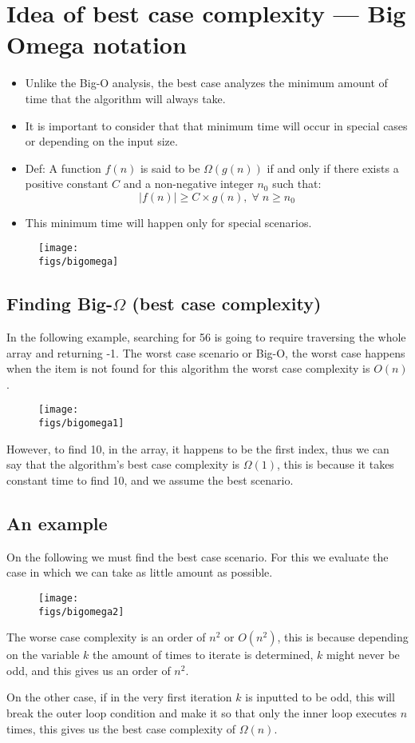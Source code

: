 \section{Idea of best case complexity — Big Omega notation}
\begin{itemize}
    \item Unlike the Big-O analysis, the best case analyzes the minimum amount of time that the algorithm will always take. 
    \item It is important to consider that that minimum time will occur in special cases or depending on the input size. 
    \item Def: A function $f(n)$ is said to be $\Omega(g(n))$ if and only if there exists a positive constant $C$ and a non-negative integer $n_0$ such that: 
        \[
          \left| f(n) \right| \geq C \times g(n), \; \forall \; n \geq n_0  
        \]
    
    \item This minimum time will happen only for special scenarios. 
\end{itemize}
\begin{figure}[H]
    \centering
    \texttt{[image: \\figs/bigomega]} 
\end{figure}

\subsection{Finding Big-$\Omega$ (best case complexity)}
In the following example, searching for 56 is going to require traversing the whole array and returning -1.  The worst case scenario or Big-O, the worst case happens when the item is not found for this algorithm the worst case complexity is $O(n)$.
\begin{figure}[H]
    \centering
    \texttt{[image: \\figs/bigomega1]} 
\end{figure}
However, to find 10, in the array, it happens to be the first index, thus we can say that the algorithm's best case complexity is $\Omega(1)$, this is because it takes constant time to find 10, and we assume the best scenario. 

\subsection{An example}
On the following we must find the best case scenario. For this we evaluate the case in which we can take as little amount as possible.
\begin{figure}[H]
    \centering
    \texttt{[image: \\figs/bigomega2]} 
\end{figure}
The worse case complexity is an order of $n^2$ or $O(n^2)$, this is because depending on the variable $k$ the amount of times to iterate is determined, $k$ might never be odd, and this gives us an order of $n^2$. \par 
On the other case, if in the very first iteration $k$ is inputted to be odd, this will break the outer loop condition and make it so that only the inner loop executes $n$ times, this gives us the best case complexity of $\Omega(n)$. 


